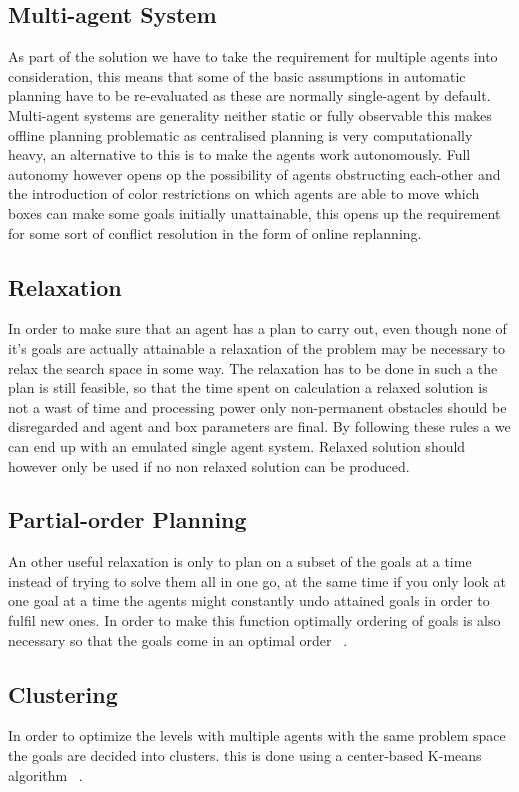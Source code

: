 \documentclass[letterpaper]{article}
\begin{document}
	\subsection{Multi-agent System}
		As part of the solution we have to take the requirement for multiple agents into consideration, this means that some of the basic assumptions in automatic planning have to be re-evaluated as these are normally single-agent by default.
		Multi-agent systems are generality neither static or fully observable this makes offline planning problematic as centralised planning is very computationally heavy, an alternative to this is to make the agents work autonomously. Full autonomy  however opens op the possibility of agents obstructing each-other and the introduction of color restrictions on which agents are able to move which boxes can make some goals initially unattainable, this opens up the requirement for some sort of conflict resolution in the form of online replanning.
	\subsection{Relaxation}
		In order to make sure that an agent has a plan to carry out, even though none of it's goals are actually attainable a relaxation of the problem may be necessary to relax the search space in some way. The relaxation has to be done in such a the plan is still feasible, so that the time spent on calculation a relaxed solution is not a wast of time and processing power only non-permanent obstacles should be disregarded and  agent and box parameters are final. By following these rules a we can end up with an emulated single agent system.
		Relaxed solution should however only be used if no non relaxed solution can be produced. 
	\subsection{Partial-order Planning}
		An other useful relaxation is only to plan on a subset of the goals at a time instead of trying to solve them all in one go, at the same time if you only look at one goal at a time the agents might constantly undo attained goals in order to fulfil new ones. In order to make this function optimally ordering of goals is also necessary so that the goals come in an optimal order ~\cite{Subgoals}.
	\subsection{Clustering}
		In order to optimize the levels with multiple agents with the same problem space the goals are decided into clusters. this is done using a center-based K-means algorithm ~\cite{K-Means}.
		
\end{document}
